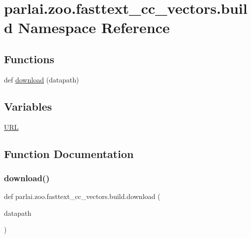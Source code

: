 \hypertarget{namespaceparlai_1_1zoo_1_1fasttext__cc__vectors_1_1build}{}\section{parlai.\+zoo.\+fasttext\+\_\+cc\+\_\+vectors.\+build Namespace Reference}
\label{namespaceparlai_1_1zoo_1_1fasttext__cc__vectors_1_1build}
\subsection*{Functions}
\begin{DoxyCompactItemize}
\item 
def \hyperlink{namespaceparlai_1_1zoo_1_1fasttext__cc__vectors_1_1build_a493e8ecb82f7444a1eee020a8dd620ce}{download} (datapath)
\end{DoxyCompactItemize}
\subsection*{Variables}
\begin{DoxyCompactItemize}
\item 
\hyperlink{namespaceparlai_1_1zoo_1_1fasttext__cc__vectors_1_1build_a3bb00344b826f64a6617c8563f1f13f1}{U\+RL}
\end{DoxyCompactItemize}


\subsection{Function Documentation}
\mbox{\label{namespaceparlai_1_1zoo_1_1fasttext__cc__vectors_1_1build_a493e8ecb82f7444a1eee020a8dd620ce}} 
\subsubsection{\texorpdfstring{download()}{download()}}
{\footnotesize\ttfamily def parlai.\+zoo.\+fasttext\+\_\+cc\+\_\+vectors.\+build.\+download (\begin{DoxyParamCaption}\item[{}]{datapath }\end{DoxyParamCaption})}




